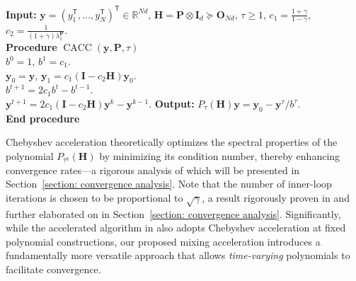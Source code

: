\documentclass[12pt,draftcls,onecolumn]{IEEEtran}
\renewcommand{\Re}{{\mathbb{R}}}
\begin{document}
\begin{algorithm}[h] 
        \renewcommand{\thealgorithm}{$\mathcal{A}'$}
        \caption{: Chebyshev Acceleration} \label{oracle cheb}
        \begin{algorithmic}[1]
                \STATE \textbf{Input:} $\mathbf{y}=(y_1^{\mathsf{T}},\ldots,y_N^{\mathsf{T}})^{\mathsf{T}}\in \Re^{Nd}$, $\mathbf{H}=\mathbf{P}\otimes \mathbf{I}_d\succeq\mathbf{O}_{Nd}$, $\tau\geq 1$, $c_1 = \frac{1+\gamma}{1-\gamma}$, $c_2=\frac{1}{(1+\gamma)\lambda_1^\mathbf{P}}$.\\
                \STATE \textbf{Procedure} $\operatorname{CACC}(\mathbf{y},\mathbf{P},\tau)$ \\
                \STATE $b^0 = 1$, $b^1 = c_1$.\\ 
	        	\STATE $\mathbf{y}_0=\mathbf{y}$, $\mathbf{y}_1=c_1(\mathbf{I}-c_2\mathbf{H})\mathbf{y}_0$.\\
                \STATE $b^{t+1}= 2c_1 b^t-b^{t-1}$.\\
                \STATE $\mathbf{y}^{t+1}=2c_1(\mathbf{I}-c_2\mathbf{H})\mathbf{y}^k-\mathbf{y}^{k-1}.$
                \ENDFOR
                \STATE \textbf{Output:} $P_{\tau}(\mathbf{H})\mathbf{y}=\mathbf{y}_0-\mathbf{y}^\tau/b^\tau$.\\
                \STATE \textbf{End procedure}\\
        \end{algorithmic}
\end{algorithm}

Chebyshev acceleration theoretically optimizes the spectral properties of the polynomial $P_{\tau^k}(\mathbf{H})$ by minimizing its condition number, thereby enhancing convergence rates—a rigorous analysis of which will be presented in Section~\ref{section: convergence analysis}. Note that the number of inner-loop iterations is chosen to be proportional to $\sqrt{\gamma}$, a result rigorously proven in \cite{sun_distributed_2019} and further elaborated on in Section~\ref{section: convergence analysis}. Significantly, while the accelerated algorithm in \cite{sun_distributed_2019} also adopts Chebyshev acceleration at fixed polynomial constructions, our proposed mixing acceleration introduces a fundamentally more versatile approach that allows \textit{time-varying} polynomials to facilitate convergence.
\end{document}
